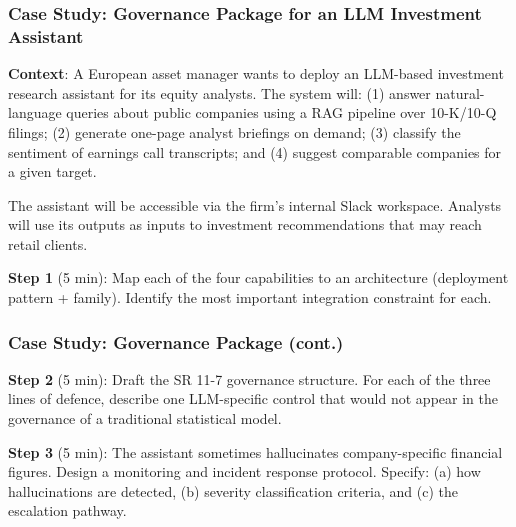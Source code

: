 \documentclass[9pt,t]{beamer}
\begin{document}
\begin{frame}
\frametitle{Case Study: Governance Package for an LLM Investment Assistant}

\textbf{Context}: A European asset manager wants to deploy an LLM-based investment research assistant for its equity analysts. The system will: (1) answer natural-language queries about public companies using a RAG pipeline over 10-K/10-Q filings; (2) generate one-page analyst briefings on demand; (3) classify the sentiment of earnings call transcripts; and (4) suggest comparable companies for a given target.

The assistant will be accessible via the firm's internal Slack workspace. Analysts will use its outputs as inputs to investment recommendations that may reach retail clients.

\medskip
\textbf{Step 1} (5 min): Map each of the four capabilities to an architecture (deployment pattern + family). Identify the most important integration constraint for each.
\end{frame}

\begin{frame}
\frametitle{Case Study: Governance Package (cont.)}

\textbf{Step 2} (5 min): Draft the SR 11-7 governance structure. For each of the three lines of defence, describe one LLM-specific control that would not appear in the governance of a traditional statistical model.

\medskip
\textbf{Step 3} (5 min): The assistant sometimes hallucinates company-specific financial figures. Design a monitoring and incident response protocol. Specify: (a) how hallucinations are detected, (b) severity classification criteria, and (c) the escalation pathway.
\end{frame}
\end{document}
